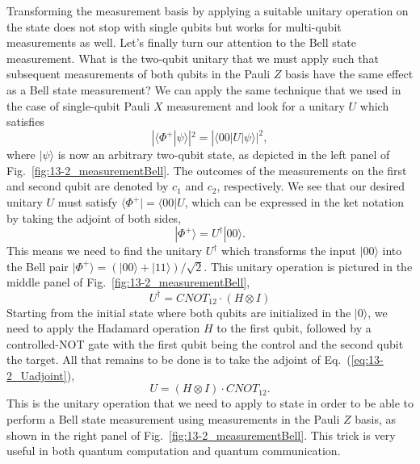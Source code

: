 Transforming the measurement basis by applying a suitable unitary operation on the state does not stop with single qubits but works for multi-qubit measurements as well.
Let's finally turn our attention to the Bell state measurement.
What is the two-qubit unitary that we must apply such that subsequent measurements of both qubits in the Pauli $Z$ basis have the same effect as a Bell state measurement?
We can apply the same technique that we used in the case of single-qubit Pauli $X$ measurement and look for a unitary $U$ which satisfies
\begin{equation}
    |\langle\Phi^+|\psi\rangle|^2 = |\langle00|U|\psi\rangle|^2,
\end{equation}
where $|\psi\rangle$ is now an arbitrary two-qubit state, as depicted in the left panel of Fig.~\ref{fig:13-2_measurementBell}.
The outcomes of the measurements on the first and second qubit are denoted by $c_1$ and $c_2$, respectively.
We see that our desired unitary $U$ must satisfy $\langle\Phi^+| = \langle00|U$, which can be expressed in the ket notation by taking the adjoint of both sides,
\begin{equation}
    |\Phi^+\rangle = U^{\dagger} |00\rangle.
\end{equation}
This means we need to find the unitary $U^{\dagger}$ which transforms the input $|00\rangle$ into the Bell pair $|\Phi^+\rangle = (|00\rangle + |11\rangle) / \sqrt{2}$.
This unitary operation is pictured in the middle panel of Fig.~\ref{fig:13-2_measurementBell},
\begin{equation}
    U^{\dagger} = CNOT_{12} \cdot (H \otimes I)
    \label{eq:13-2_Uadjoint}
\end{equation}
Starting from the initial state where both qubits are initialized in the $|0\rangle$, we need to apply the Hadamard operation $H$ to the first qubit, followed by a controlled-NOT gate with the first qubit being the control and the second qubit the target.
All that remains to be done is to take the adjoint of Eq.~(\ref{eq:13-2_Uadjoint}),
\begin{equation}
    U = (H \otimes I) \cdot CNOT_{12}.
\end{equation}
This is the unitary operation that we need to apply to state in order to be able to perform a Bell state measurement using measurements in the Pauli $Z$ basis, as shown in the right panel of Fig.~\ref{fig:13-2_measurementBell}.
This trick is very useful in both quantum computation and quantum communication.



